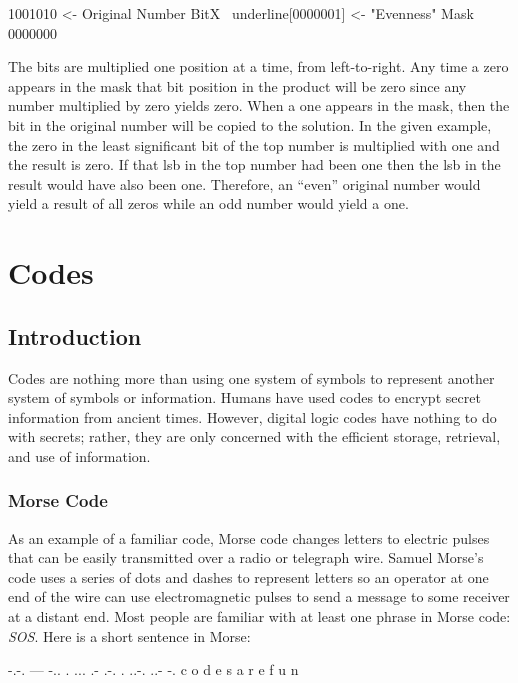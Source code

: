 \begin{binDisp}[commandchars=~\[\]]
         1001010  <- Original Number
    BitX ~underline[0000001]  <- "Evenness" Mask
         0000000
\end{binDisp}

The bits are multiplied one position at a time, from left-to-right. Any time a zero appears in the mask that bit position in the product will be zero since any number multiplied by zero yields zero. When a one appears in the mask, then the bit in the original number will be copied to the solution. In the given example, the zero in the least significant bit of the top number is multiplied with one and the result is zero. If that \gls{lsb} in the top number had been one then the \gls{lsb} in the result would have also been one. Therefore, an ``even'' original number would yield a result of all zeros while an odd number would yield a one.

\section{Codes}
\label{MO:sec:codes}

\subsection{Introduction}
\label{MO:sub:codes_introduction}

Codes are nothing more than using one system of symbols to represent another system of symbols or information. Humans have used codes to encrypt secret information from ancient times. However, digital logic codes have nothing to do with secrets; rather, they are only concerned with the efficient storage, retrieval, and use of information. 

\subsubsection{Morse Code}
\label{MO:subsub:morse_code}

As an example of a familiar code, Morse code changes letters to electric pulses that can be easily transmitted over a radio or telegraph wire. Samuel Morse's code uses a series of dots and dashes to represent letters so an operator at one end of the wire can use electromagnetic pulses to send a message to some receiver at a distant end. Most people are familiar with at least one phrase in Morse code: \emph{SOS}. Here is a short sentence in Morse: 

\begin{binDisp}[commandchars=~\[\]]
  -.-. --- -.. . ...   .- .-. .   ..-. ..- -.
   c    o   d  e  s    a   r  e    f    u  n
\end{binDisp}

